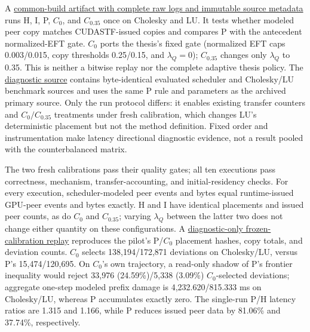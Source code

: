 \documentclass[sigconf]{acmart}
\begin{document}
A \href{https://github.com/thynics/stf_ics/blob/402f3d16e2f43649b33b4c6af67a9929ff944c33/jobs/20260724-ross-reviewer-direct-baseline-traffic-pilot-1run/results/pilot_analysis.md}{common-build artifact with complete raw logs and immutable source metadata} runs H, I, P, \(C_0\), and \(C_{0.35}\) once on Cholesky and LU. It tests whether modeled peer copy matches CUDASTF-issued copies and compares P with the antecedent normalized-EFT gate. \(C_0\) ports the thesis's fixed gate (normalized EFT caps 0.003/0.015, copy thresholds 0.25/0.15, and \(\lambda_Q=0\)); \(C_{0.35}\) changes only \(\lambda_Q\) to 0.35. This is neither a bitwise replay nor the complete adaptive thesis policy. The \href{https://github.com/thynics/stf_ics/commit/80c2b73e58c9dc28207aecce93e77e911db484e4}{diagnostic source} contains byte-identical evaluated scheduler and Cholesky/LU benchmark sources and uses the same P rule and parameters as the archived primary source. Only the run protocol differs: it enables existing transfer counters and \(C_0/C_{0.35}\) treatments under fresh calibration, which changes LU's deterministic placement but not the method definition. Fixed order and instrumentation make latency directional diagnostic evidence, not a result pooled with the counterbalanced matrix.



The two fresh calibrations pass their quality gates; all ten executions pass correctness, mechanism, transfer-accounting, and initial-residency checks. For every execution, scheduler-modeled peer events and bytes equal runtime-issued GPU-peer events and bytes exactly. H and I have identical placements and issued peer counts, as do \(C_0\) and \(C_{0.35}\); varying \(\lambda_Q\) between the latter two does not change either quantity on these configurations. A \href{https://github.com/thynics/stf_ics/blob/47ca4c5e7f793ddb9d136810bac203952f3d4cab/jobs/20260724-ross-reviewer-c0-prefix-damage-1run/results/summary.md}{diagnostic-only frozen-calibration replay} reproduces the pilot's P/\(C_0\) placement hashes, copy totals, and deviation counts. \(C_0\) selects 138,194/172,871 deviations on Cholesky/LU, versus P's 15,474/120,695. On \(C_0\)'s own trajectory, a read-only shadow of P's frontier inequality would reject 33,976 (24.59\%)/5,338 (3.09\%) \(C_0\)-selected deviations; aggregate one-step modeled prefix damage is 4,232.620/815.333 ms on Cholesky/LU, whereas P accumulates exactly zero. The single-run P/H latency ratios are 1.315 and 1.166, while P reduces issued peer data by 81.06\% and 37.74\%, respectively.
\end{document}
